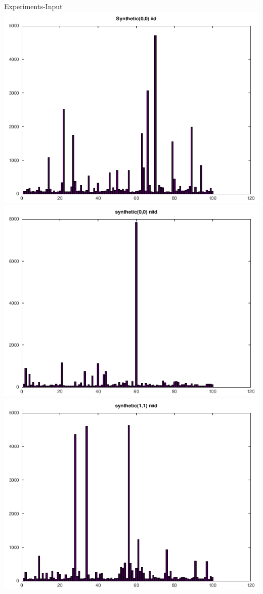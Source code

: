 \documentclass{beamer}
\begin{document}
\begin{frame}{Experiments-Input}
	\includegraphics[scale=0.2]{sy00iid.png}
	\includegraphics[scale=0.2]{sy00niid.png}
	\includegraphics[scale=0.2]{sy11.png}

\end{frame}
\end{document}
